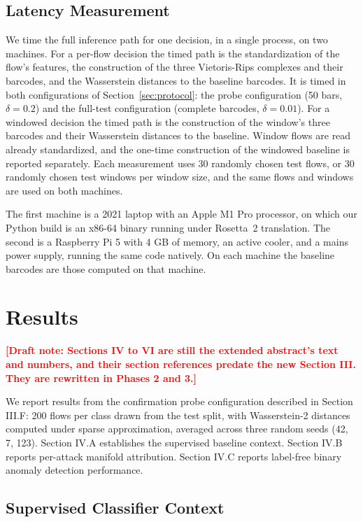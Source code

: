 \documentclass[conf]{new-aiaa}
\newcommand{\draftnote}[1]{\par\noindent\textcolor{red}{\textbf{[Draft note: #1]}}\par}
\begin{document}
\subsection{Latency Measurement}
\label{sec:latency}

We time the full inference path for one decision, in a single process, on two machines. For a per-flow decision the timed path is the standardization of the flow's features, the construction of the three Vietoris-Rips complexes and their barcodes, and the Wasserstein distances to the baseline barcodes. It is timed in both configurations of Section~\ref{sec:protocol}: the probe configuration (50 bars, $\delta = 0.2$) and the full-test configuration (complete barcodes, $\delta = 0.01$). For a windowed decision the timed path is the construction of the window's three barcodes and their Wasserstein distances to the baseline. Window flows are read already standardized, and the one-time construction of the windowed baseline is reported separately. Each measurement uses 30 randomly chosen test flows, or 30 randomly chosen test windows per window size, and the same flows and windows are used on both machines.

The first machine is a 2021 laptop with an Apple M1 Pro processor, on which our Python build is an x86-64 binary running under Rosetta~2 translation. The second is a Raspberry Pi 5 with 4 GB of memory, an active cooler, and a mains power supply, running the same code natively. On each machine the baseline barcodes are those computed on that machine.

\section{Results}
\draftnote{Sections IV to VI are still the extended abstract's text and numbers, and their section references predate the new Section III. They are rewritten in Phases 2 and 3.}

We report results from the confirmation probe configuration described in Section III.F: 200 flows per class drawn from the test split, with Wasserstein-2 distances computed under sparse approximation, averaged across three random seeds (42, 7, 123). Section IV.A establishes the supervised baseline context. Section IV.B reports per-attack manifold attribution. Section IV.C reports label-free binary anomaly detection performance.

\subsection{Supervised Classifier Context}
\end{document}
